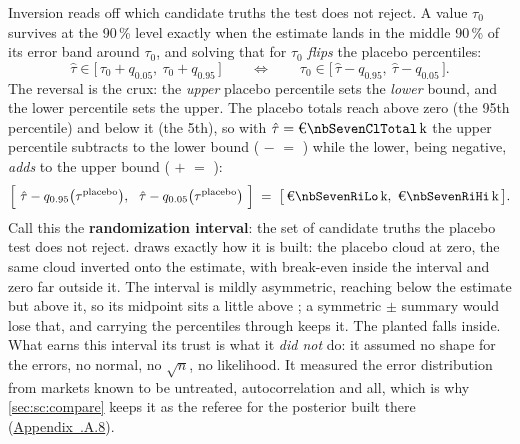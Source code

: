 Inversion reads off which candidate truths the test does not reject. A value $\tau_0$ survives at the
90\,\% level exactly when the estimate lands in the middle 90\,\% of its error band around $\tau_0$,
and solving that for $\tau_0$ \emph{flips} the placebo percentiles:
%
\begin{equation*}
  \hat\tau \in \big[\,\tau_0 + q_{0.05},\ \tau_0 + q_{0.95}\,\big]
  \qquad\Longleftrightarrow\qquad
  \tau_0 \in \big[\,\hat\tau - q_{0.95},\ \hat\tau - q_{0.05}\,\big].
\end{equation*}
%
The reversal is the crux: the \emph{upper} placebo percentile sets the \emph{lower} bound, and the
lower percentile sets the upper. The placebo totals reach \keur{\nbSevenPlaceboQhi} above zero (the
95th percentile) and \keur{\nbSevenPlaceboQloMag} below it (the 5th), so with
$\hat\tau = \keur{\nbSevenClTotal}$ the upper percentile subtracts to the lower bound
(\keur{\nbSevenClTotal} $-$ \keur{\nbSevenPlaceboQhi} $=$ \keur{\nbSevenRiLo}) while the lower, being
negative, \emph{adds} to the upper bound (\keur{\nbSevenClTotal} $+$ \keur{\nbSevenPlaceboQloMag} $=$
\keur{\nbSevenRiHi}):
%
\begin{equation}
  \Big[\ \hat\tau - q_{0.95}\big(\tau^{\text{placebo}}\big),\ \
         \hat\tau - q_{0.05}\big(\tau^{\text{placebo}}\big)\ \Big]
  \;=\; \big[\,\keur{\nbSevenRiLo},\ \keur{\nbSevenRiHi}\,\big].
  \label{eq:sc:ri}
\end{equation}
%
Call this the \textbf{randomization interval}: the set of candidate truths the placebo test does not
reject. \Cref{fig:sc:inversion} draws exactly how it is built: the placebo cloud at zero, the same cloud
inverted onto the estimate, with break-even inside the interval and zero far outside it. The interval is mildly
asymmetric, reaching \keur{\nbSevenPlaceboQhi} below the estimate but \keur{\nbSevenPlaceboQloMag} above
it, so its midpoint sits a little above \keur{\nbSevenClTotal}; a symmetric $\pm$ summary would lose
that, and carrying the percentiles through keeps it. The planted \keur{\nbSevenTrueTotal} falls inside.
What earns this interval its trust is what it \emph{did not} do: it assumed no shape for the errors, no
normal, no $\sqrt{n}$, no likelihood. It measured the error distribution from markets known to be
untreated, autocorrelation and all, which is why \cref{sec:sc:compare} keeps it as the referee for the
posterior built there (\hyperref[app:sc:randint]{Appendix~\thechapter.A.8}).



